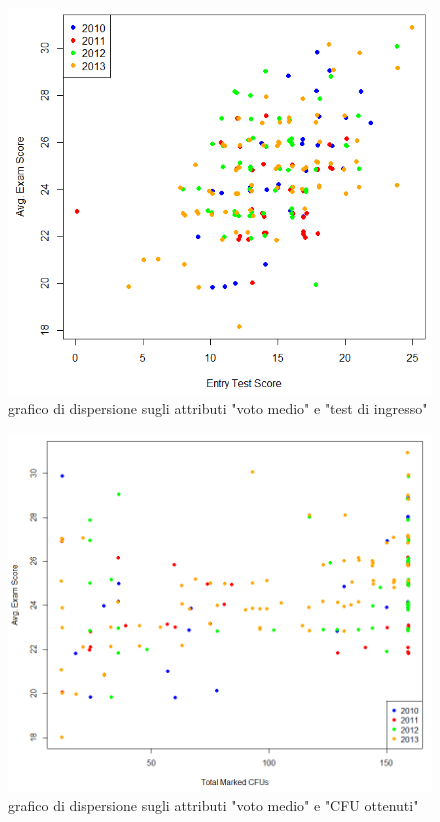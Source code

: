             \begin{figure}
                \centering
                \caption{grafico di dispersione sugli attributi "voto medio" e "test di ingresso"}
                \label{fig2}
            	\includegraphics[scale=0.80]{img/scatter_plot_2.png}
            \end{figure}

            \begin{figure}
                \centering
                \caption{grafico di dispersione sugli attributi "voto medio" e "CFU ottenuti"}
                \label{fig3}
            	\includegraphics[scale=0.62]{img/scatter_plot_3.png}
            \end{figure}

